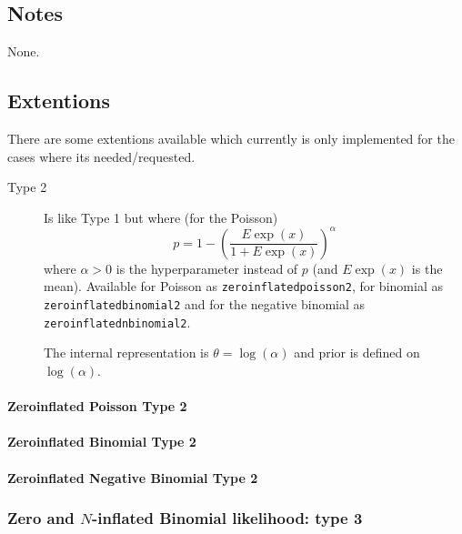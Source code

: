 \documentclass[a4paper,11pt]{article}
\begin{document}
\subsection*{Notes}

None.




\subsection*{Extentions}

There are some extentions available which currently is only
implemented for the cases where its needed/requested.
\begin{description}
\item[Type 2] Is like Type 1 but where (for the Poisson)
    \begin{displaymath}
        p = 1-\left( \frac{E\exp(x)}{1 + E\exp(x)}\right)^{\alpha}
    \end{displaymath}
    where $\alpha > 0$ is the hyperparameter instead of $p$ (and
    $E\exp(x)$ is the mean).  Available for Poisson as
    \texttt{zeroinflatedpoisson2}, for binomial as
    \texttt{zeroinflatedbinomial2} and for the negative binomial as
    \texttt{zeroinflatednbinomial2}.

    The internal representation is $\theta = \log(\alpha)$ and prior
    is defined on $\log(\alpha)$.
\end{description}

\paragraph{Zeroinflated Poisson Type 2}


\paragraph{Zeroinflated Binomial Type 2}


\paragraph{Zeroinflated Negative Binomial Type 2}



\subsubsection{Zero and $N$-inflated Binomial likelihood: type 3}
\end{document}
